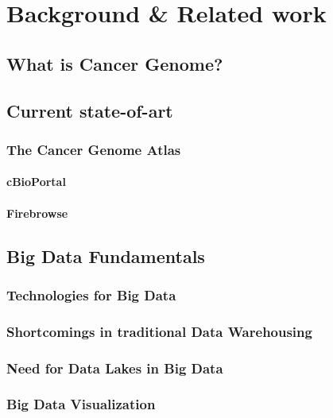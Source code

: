 %

\chapter{Background \& Related work}
\label{relatedwork}
\section{What is Cancer Genome?}
\section{Current state-of-art}
\subsection{The Cancer Genome Atlas}
\label{relatedwork.tcga}
\subsubsection{cBioPortal}
\label{relatedwork.cbioportal}
\subsubsection{Firebrowse}
\label{relatedework.firebrowse}
\section{Big Data Fundamentals}
\label{relatedework.fundamentals}
\subsection{Technologies for Big Data}
\label{relatedework.technologies}
\subsection{Shortcomings in traditional Data Warehousing}
\label{relatedework.tdw}
\subsection{Need for Data Lakes in Big Data}
\label{relatedework.datalake}
\subsection{Big Data Visualization}
\label{relatedework.visualization}

